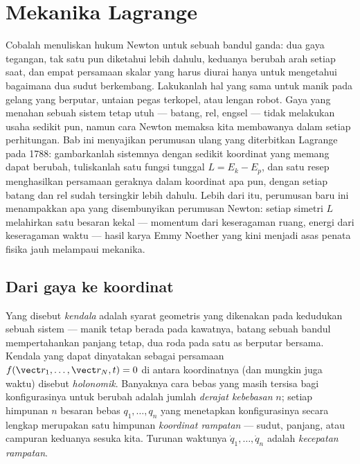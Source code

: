 \chapter{Mekanika Lagrange}\label{ch:b3:lagrangian-mechanics}

Cobalah menuliskan hukum Newton untuk sebuah bandul ganda: dua gaya
tegangan, tak satu pun diketahui lebih dahulu, keduanya berubah arah
setiap saat, dan empat persamaan skalar yang harus diurai hanya untuk
mengetahui bagaimana dua sudut berkembang. Lakukanlah hal yang sama
untuk manik pada gelang yang berputar, untaian pegas terkopel, atau
lengan robot. Gaya yang menahan sebuah sistem tetap utuh --- batang,
rel, engsel --- tidak melakukan usaha sedikit pun, namun cara Newton
memaksa kita membawanya dalam setiap perhitungan. Bab ini menyajikan
perumusan ulang yang diterbitkan Lagrange pada 1788: gambarkanlah
sistemnya dengan sedikit koordinat yang memang dapat berubah,
tuliskanlah satu fungsi tunggal $L = E_k - E_p$, dan satu resep
menghasilkan persamaan geraknya dalam koordinat apa pun, dengan setiap
batang dan rel sudah tersingkir lebih dahulu. Lebih dari itu, perumusan
baru ini menampakkan apa yang disembunyikan perumusan Newton: setiap
simetri $L$ melahirkan satu besaran kekal --- momentum dari keseragaman
ruang, energi dari keseragaman waktu --- hasil karya Emmy Noether yang
kini menjadi asas penata fisika jauh melampaui mekanika.

\section{Dari gaya ke koordinat}

\begin{definition}\label{def:b3:lagrangian-mechanics:coordinates}
Yang disebut \emph{kendala} adalah syarat geometris yang dikenakan pada
kedudukan sebuah sistem --- manik tetap berada pada kawatnya, batang
sebuah bandul mempertahankan panjang tetap, dua roda pada satu as
berputar bersama. Kendala yang dapat dinyatakan sebagai persamaan
$f(\vect r_1, \dots, \vect r_N, t) = 0$ di antara koordinatnya (dan
mungkin juga waktu) disebut \emph{holonomik}. Banyaknya cara bebas yang
masih tersisa bagi konfigurasinya untuk berubah adalah jumlah
\emph{derajat kebebasan} $n$; setiap himpunan $n$ besaran bebas
$q_1, \dots, q_n$ yang menetapkan konfigurasinya secara lengkap
merupakan satu himpunan \emph{koordinat rampatan} --- sudut, panjang,
atau campuran keduanya sesuka kita. Turunan waktunya
$\dot q_1, \dots, \dot q_n$ adalah
\emph{kecepatan rampatan}.
\end{definition}

